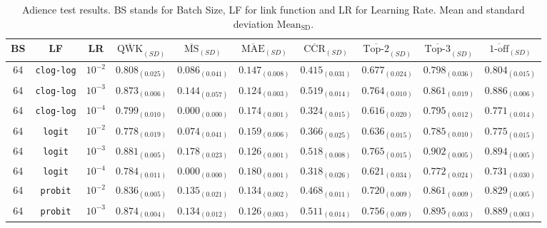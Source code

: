 \documentclass[journal]{IEEEtran}
\begin{document}
	\begin{table}[!t]
		\caption{Adience test results. BS stands for Batch Size, LF for link function and LR for Learning Rate. Mean and standard deviation $\text{Mean}_\text{SD}$.}
		\label{table:AdienceTest}
		\footnotesize
		\centering
		\begin{tabular}{c@{\hskip 0.15cm}c@{\hskip 0.15cm}c@{\hskip 0.15cm}c@{\hskip 0.30cm}c@{\hskip 0.20cm}c@{\hskip 0.20cm}c@{\hskip 0.20cm}c@{\hskip 0.20cm}c@{\hskip 0.20cm}c}
			\hline
			\hline
			BS & LF & LR & $\overline{\text{QWK}}_{{(SD)}}$ & $\overline{\text{MS}}_{{(SD)}}$ & $\overline{\text{MAE}}_{{(SD)}}$ & $\overline{\text{CCR}}_{{(SD)}}$ & $\overline{\text{Top-2}}_{{(SD)}}$ & $\overline{\text{Top-3}}_{{(SD)}}$ & $\overline{\text{1-off}}_{{(SD)}}$\\\hline
			64 & \texttt{clog-log} & $10^{-2}$ & $0.808_{(0.025)}$ & $0.086_{(0.041)}$ & $0.147_{(0.008)}$ & $0.415_{(0.031)}$ & $0.677_{(0.024)}$ & $0.798_{(0.036)}$ & $0.804_{(0.015)}$\\
			64 & \texttt{clog-log} & $10^{-3}$ & $0.873_{(0.006)}$ & $0.144_{(0.057)}$ & $\mathbf{0.124_{(0.003)}}$ & $\mathbf{0.519_{(0.014)}}$ & $\mathit{0.764_{(0.010)}}$ & $0.861_{(0.019)}$ & $0.886_{(0.006)}$\\
			64 & \texttt{clog-log} & $10^{-4}$ & $0.799_{(0.010)}$ & $0.000_{(0.000)}$ & $0.174_{(0.001)}$ & $0.324_{(0.015)}$ & $0.616_{(0.020)}$ & $0.795_{(0.012)}$ & $0.771_{(0.014)}$\\
			64 & \texttt{logit} & $10^{-2}$ & $0.778_{(0.019)}$ & $0.074_{(0.041)}$ & $0.159_{(0.006)}$ & $0.366_{(0.025)}$ & $0.636_{(0.015)}$ & $0.785_{(0.010)}$ & $0.775_{(0.015)}$\\
			64 & \texttt{logit} & $10^{-3}$ & $\mathbf{0.881_{(0.005)}}$ & $\mathit{0.178_{(0.023)}}$ & $\mathit{0.126_{(0.001)}}$ & $\mathit{0.518_{(0.008)}}$ & $\mathbf{0.765_{(0.015)}}$ & $\mathbf{0.902_{(0.005)}}$ & $\mathbf{0.894_{(0.005)}}$\\
			64 & \texttt{logit} & $10^{-4}$ & $0.784_{(0.011)}$ & $0.000_{(0.000)}$ & $0.180_{(0.001)}$ & $0.318_{(0.026)}$ & $0.621_{(0.034)}$ & $0.772_{(0.024)}$ & $0.731_{(0.030)}$\\
			64 & \texttt{probit} & $10^{-2}$ & $0.836_{(0.005)}$ & $0.135_{(0.021)}$ & $0.134_{(0.002)}$ & $0.468_{(0.011)}$ & $0.720_{(0.009)}$ & $0.861_{(0.009)}$ & $0.829_{(0.005)}$\\
			64 & \texttt{probit} & $10^{-3}$ & $\mathit{0.874_{(0.004)}}$ & $0.134_{(0.012)}$ & $0.126_{(0.003)}$ & $0.511_{(0.014)}$ & $0.756_{(0.009)}$ & $\mathit{0.895_{(0.003)}}$ & $\mathit{0.889_{(0.003)}}$\\

\end{tabular}
\end{table}
\end{document}
